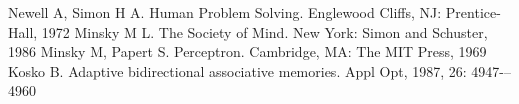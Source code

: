 \documentclass[a4paper,12pt,twocolumn]{article}
\begin{document}
	\begin{thebibliography}{99}
	   Newell A, Simon H A. Human Problem Solving. Englewood Cliffs, NJ: Prentice-Hall, 1972 
	  Minsky M L. The Society of Mind. New York: Simon and Schuster, 1986 
	    Minsky M, Papert S. Perceptron. Cambridge, MA: The MIT Press, 1969 
	  Kosko B. Adaptive bidirectional associative memories. Appl Opt, 1987, 26: 4947-–4960  
\end{thebibliography}
\end{document}
